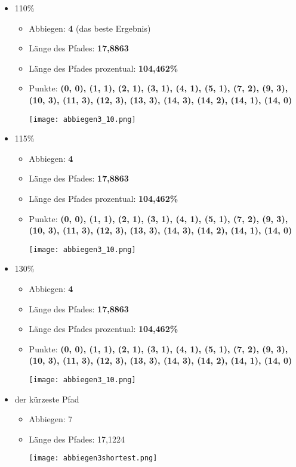 \documentclass[a4paper,10pt,ngerman]{scrartcl}
\begin{document}
\begin{itemize}
  \item 110\%    
    \begin{itemize}
      \item Abbiegen: \textbf{4} (das beste Ergebnis)
      \item Länge des Pfades: \textbf{17,8863}
      \item Länge des Pfades prozentual: \textbf{104,462\%}
      \item Punkte: \textbf{(0, 0), (1, 1), (2, 1), (3, 1), (4, 1), (5, 1), (7, 2), 
      (9, 3), (10, 3), (11, 3), (12, 3), (13, 3), (14, 3), (14, 2), (14, 1), (14, 0)}
\begin{center}
\texttt{[image: abbiegen3\_10.png]}
\end{center}
    \end{itemize}
  \item 115\%    
    \begin{itemize}
      \item Abbiegen: \textbf{4}
      \item Länge des Pfades: \textbf{17,8863}
      \item Länge des Pfades prozentual: \textbf{104,462\%}
      \item Punkte: \textbf{(0, 0), (1, 1), (2, 1), (3, 1), (4, 1), (5, 1), (7, 2), 
      (9, 3), (10, 3), (11, 3), (12, 3), (13, 3), (14, 3), (14, 2), (14, 1), (14, 0)}
\begin{center}
\texttt{[image: abbiegen3\_10.png]}
\end{center}
    \end{itemize}
  \item 130\%    
    \begin{itemize}
      \item Abbiegen: \textbf{4}
      \item Länge des Pfades: \textbf{17,8863}
      \item Länge des Pfades prozentual: \textbf{104,462\%}
      \item Punkte: \textbf{(0, 0), (1, 1), (2, 1), (3, 1), (4, 1), (5, 1), (7, 2), 
      (9, 3), (10, 3), (11, 3), (12, 3), (13, 3), (14, 3), (14, 2), (14, 1), (14, 0)}
\begin{center}
\texttt{[image: abbiegen3\_10.png]}
\end{center}
    \end{itemize}
  \item der kürzeste Pfad   
    \begin{itemize}
      \item Abbiegen: 7
      \item Länge des Pfades: 17,1224
\begin{center}
\texttt{[image: abbiegen3shortest.png]}
\end{center}
    \end{itemize}
\end{itemize}
\end{document}
